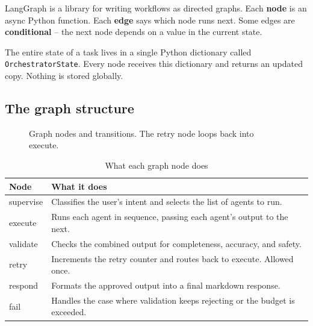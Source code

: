 \documentclass[12pt,a4paper]{article}
\begin{document}
LangGraph is a library for writing workflows as directed graphs. Each \textbf{node} is an async Python function. Each \textbf{edge} says which node runs next. Some edges are \textbf{conditional} -- the next node depends on a value in the current state.

The entire state of a task lives in a single Python dictionary called \texttt{OrchestratorState}. Every node receives this dictionary and returns an updated copy. Nothing is stored globally.

\subsection{The graph structure}

\begin{figure}[H]
\centering
{}
\caption{Graph nodes and transitions. The retry node loops back into execute.}
\end{figure}

\begin{table}[H]
\centering
\small
\begin{tabular}{@{}p{2.2cm}p{11.5cm}@{}}
\toprule
\textbf{Node} & \textbf{What it does} \\
\midrule
supervise & Classifies the user's intent and selects the list of agents to run. \\
execute   & Runs each agent in sequence, passing each agent's output to the next. \\
validate  & Checks the combined output for completeness, accuracy, and safety. \\
retry     & Increments the retry counter and routes back to execute. Allowed once. \\
respond   & Formats the approved output into a final markdown response. \\
fail      & Handles the case where validation keeps rejecting or the budget is exceeded. \\
\bottomrule
\end{tabular}
\caption{What each graph node does}
\end{table}
\end{document}
